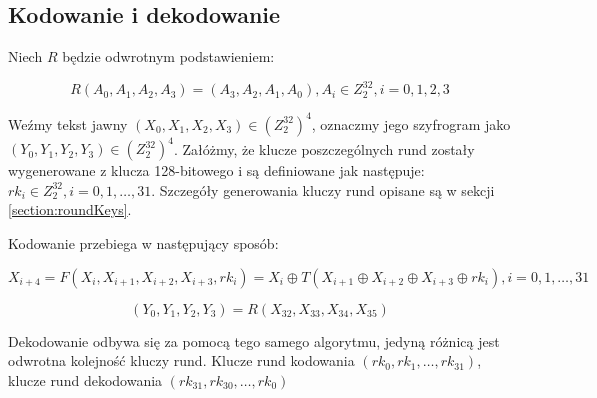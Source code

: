 \subsection{Kodowanie i dekodowanie}

Niech $R$ będzie odwrotnym podstawieniem:

\begin{equation*}
    R(A_0, A_1, A_2, A_3) = (A_3, A_2, A_1, A_0), A_i \in Z^{32}_2, i = 0, 1, 2, 3
\end{equation*}

Weźmy tekst jawny $(X_0, X_1, X_2, X_3) \in (Z^{32}_2)^4$, oznaczmy jego szyfrogram jako $(Y_0, Y_1, Y_2, Y_3) \in (Z^{32}_2)^4$. Załóżmy, że klucze poszczególnych rund zostały wygenerowane z klucza 128-bitowego i są definiowane jak następuje: $rk_i \in Z^{32}_2, i = 0,1, \ldots, 31$. Szczegóły generowania kluczy rund opisane są w sekcji \ref{section:roundKeys}.

Kodowanie przebiega w następujący sposób:

\begin{equation*}
    X_{i+4} = F(X_i, X_{i+1}, X_{i+2}, X_{i+3}, rk_i) = X_i \oplus T(X_{i+1} \oplus X_{i+2} \oplus X_{i+3} \oplus rk_i), i = 0,1,\ldots,31
\end{equation*}
        
\begin{equation*}
    (Y_0, Y_1, Y_2, Y_3) = R(X_{32}, X_{33}, X_{34}, X_{35})
\end{equation*}

Dekodowanie odbywa się za pomocą tego samego algorytmu, jedyną różnicą jest odwrotna kolejność kluczy rund. Klucze rund kodowania $(rk_0, rk_1, \ldots, rk_{31})$, klucze rund dekodowania $(rk_{31}, rk_{30}, \ldots, rk_0)$


